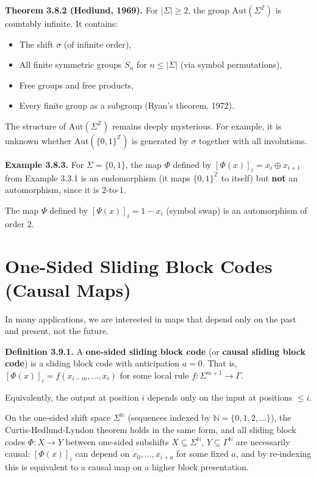 \textbf{Theorem 3.8.2 (Hedlund, 1969).} For $|\Sigma| \geq 2$, the group $\text{Aut}(\Sigma^\mathbb{Z})$ is countably infinite. It contains:
\begin{itemize}
\item The shift $\sigma$ (of infinite order),
\item All finite symmetric groups $S_n$ for $n \leq |\Sigma|$ (via symbol permutations),
\item Free groups and free products,
\item Every finite group as a subgroup (Ryan's theorem, 1972).
\end{itemize}

The structure of $\text{Aut}(\Sigma^\mathbb{Z})$ remains deeply mysterious. For example, it is unknown whether $\text{Aut}(\{ 0,1\} ^\mathbb{Z})$ is generated by $\sigma$ together with all involutions.

\textbf{Example 3.8.3.} For $\Sigma = \{ 0, 1\} $, the map $\Phi$ defined by $[\Phi(x)]_i = x_i \oplus x_{i+1}$ from Example 3.3.1 is an endomorphism (it maps $\{ 0,1\} ^\mathbb{Z}$ to itself) but \textbf{not} an automorphism, since it is 2-to-1.

The map $\Psi$ defined by $[\Psi(x)]_i = 1 - x_i$ (symbol swap) is an automorphism of order 2.



\section{One-Sided Sliding Block Codes (Causal Maps)}

In many applications, we are interested in maps that depend only on the past and present, not the future.

\textbf{Definition 3.9.1.} A \textbf{one-sided sliding block code} (or \textbf{causal sliding block code}) is a sliding block code with anticipation $a = 0$. That is, $[\Phi(x)]_i = f(x_{i-m}, \ldots, x_i)$ for some local rule $f: \Sigma^{m+1} \to \Gamma$.

Equivalently, the output at position $i$ depends only on the input at positions $\leq i$.

On the one-sided shift space $\Sigma^\mathbb{N}$ (sequences indexed by $\mathbb{N} = \{ 0, 1, 2, \ldots\} $), the Curtis-Hedlund-Lyndon theorem holds in the same form, and all sliding block codes $\Phi: X \to Y$ between one-sided subshifts $X \subseteq \Sigma^\mathbb{N}$, $Y \subseteq \Gamma^\mathbb{N}$ are necessarily causal: $[\Phi(x)]_i$ can depend on $x_0, \ldots, x_{i+a}$ for some fixed $a$, and by re-indexing this is equivalent to a causal map on a higher block presentation.


